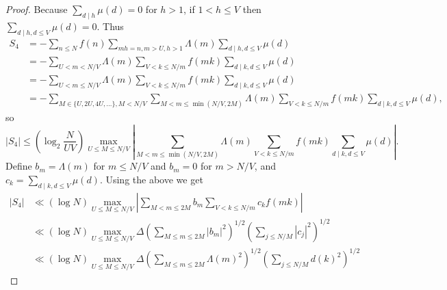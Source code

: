 \documentclass{article}
\theoremstyle{definition}
\begin{document}
\begin{proof}
Because $\sum_{d \mid h} \mu(d)=0$ for $h>1$, if $1 < h \leq V$ then $\sum_{d \mid h, d \leq V} \mu(d)=0$. Thus
\begin{align*}
S_4&=- \sum_{n \leq N} f(n) \sum_{mh=n, m>U, h>1} \Lambda(m) \sum_{d \mid h, d \leq V} \mu(d)\\
&=-\sum_{U<m < N/V}  \Lambda(m) \sum_{V<k \leq N/m} f(mk) \sum_{d \mid k, d \leq V} \mu(d)\\
&=-\sum_{U<m \leq N/V}  \Lambda(m) \sum_{V<k \leq N/m} f(mk) \sum_{d \mid k, d \leq V} \mu(d)\\
&=-\sum_{M \in \{U,2U,4U,\ldots\}, M<N/V} \sum_{M<m \leq \min(N/V,2M)}  \Lambda(m) \sum_{V<k \leq N/m} f(mk) \sum_{d \mid k, d \leq V} \mu(d),
\end{align*}
so
\[
|S_4| \leq \left( \log_2 \frac{N}{UV}\right) \max_{U \leq M \leq N/V} \left| \sum_{M<m \leq \min(N/V,2M)}  \Lambda(m) \sum_{V<k \leq N/m} f(mk) \sum_{d \mid k, d \leq V} \mu(d)
\right|.
\]
Define $b_m = \Lambda(m)$ for $m \leq N/V$ and $b_m=0$ for $m>N/V$, 
and $c_k = \sum_{d \mid k, d\leq V} \mu(d)$. 
Using the above we get
\begin{align*}
|S_4| & \ll ( \log N) \max_{U \leq M \leq N/V} \left| \sum_{M<m \leq 2M} b_m \sum_{V<k \leq N/m} c_k f(mk)\right|\\
&\ll (\log N) \max_{U \leq M \leq N/V} \Delta \left( \sum_{M \leq m \leq 2M} |b_m|^2 \right)^{1/2} \left(  \sum_{j \leq N/M}  |c_j|^2  \right)^{1/2}\\
&\ll (\log N) \max_{U \leq M \leq N/V} \Delta \left( \sum_{M \leq m \leq 2M} \Lambda(m)^2 \right)^{1/2} 
\left( \sum_{j \leq N/M} d(k)^2\right)^{1/2}
\end{align*}


\end{proof}
\end{document}
